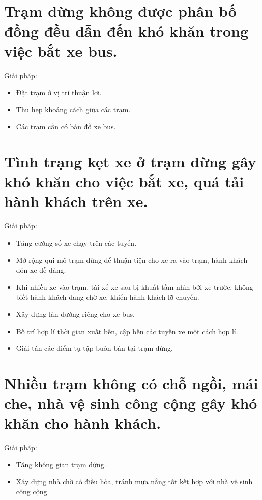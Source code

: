 \section{Trạm dừng không được phân bố đồng đều dẫn đến khó khăn trong việc bắt xe bus.}

Giải pháp:

\begin{itemize}
	\item Đặt trạm ở vị trí thuận lợi.
	\item Thu hẹp khoảng cách giữa các trạm.
	\item Các trạm cần có bản đồ xe bus.
\end{itemize}




\section{Tình trạng kẹt xe ở trạm dừng gây khó khăn cho việc bắt xe, quá tải hành khách trên xe.}

Giải pháp:

\begin{itemize}
	\item Tăng cường số xe chạy trên các tuyến.
	\item Mở rộng qui mô trạm dừng để thuận tiện cho xe ra vào trạm, hành khách đón xe dễ dàng.
	\item Khi nhiều xe vào trạm, tài xế xe sau bị khuất tầm nhìn bởi xe trước, không biết hành khách đang chờ xe, khiến hành khách lỡ chuyến.
	\item Xây dựng làn đường riêng cho xe bus.
	\item Bố trí hợp lí thời gian xuất bến, cập bến các tuyến xe một cách hợp lí.
	\item Giải tán các điểm tụ tập buôn bán tại trạm dừng.
\end{itemize}

\section{Nhiều trạm không có chỗ ngồi, mái che, nhà vệ sinh công cộng gây khó khăn cho hành khách.}

Giải pháp:

\begin{itemize}
	\item Tăng không gian trạm dừng.
	\item Xây dựng nhà chờ có điều hòa, tránh mưa nắng tốt kết hợp với nhà vệ sinh công cộng.
\end{itemize}

